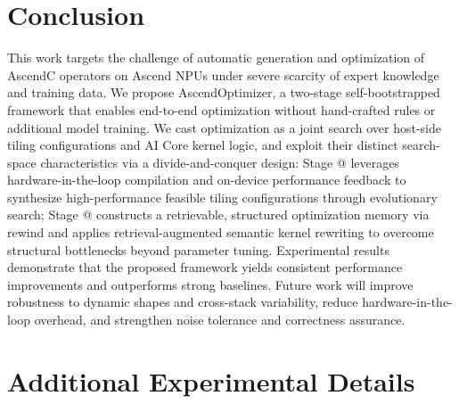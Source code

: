\documentclass{article}
\makeatletter
\theoremstyle{plain}
\theoremstyle{definition}
\theoremstyle{remark}
\newcommand{\Rmnum}[1]{\expandafter\@slowromancap\romannumeral #1@}
\makeatother
\begin{document}
\FloatBarrier
\section{Conclusion}
\label{sec:conclusion}
This work targets the challenge of automatic generation and optimization of AscendC operators on Ascend NPUs under severe scarcity of expert knowledge and training data. We propose AscendOptimizer, a two-stage self-bootstrapped framework that enables end-to-end optimization without hand-crafted rules or additional model training. We cast optimization as a joint search over host-side tiling configurations and AI Core kernel logic, and exploit their distinct search-space characteristics via a divide-and-conquer design: Stage \Rmnum{1} leverages hardware-in-the-loop compilation and on-device performance feedback to synthesize high-performance feasible tiling configurations through evolutionary search; Stage \Rmnum{2} constructs a retrievable, structured optimization memory via rewind and applies retrieval-augmented semantic kernel rewriting to overcome structural bottlenecks beyond parameter tuning. Experimental results demonstrate that the proposed framework yields consistent performance improvements and outperforms strong baselines. Future work will improve robustness to dynamic shapes and cross-stack variability, reduce hardware-in-the-loop overhead, and strengthen noise tolerance and correctness assurance.



\nocite{langley00}




\newpage
\appendix
\onecolumn

\section{Additional Experimental Details}
\label{app:exp_details}

\end{document}
